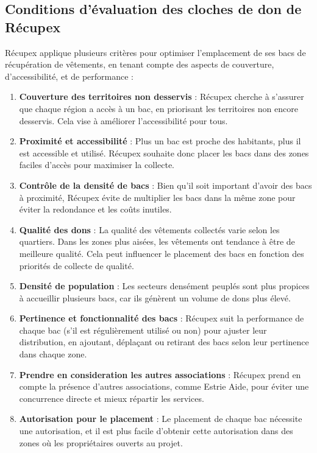 \documentclass[11pt]{article}
\begin{document}
\subsection{Conditions d'évaluation des cloches de don de Récupex}
Récupex applique plusieurs critères pour optimiser l’emplacement de ses bacs de récupération de vêtements, en tenant compte des aspects de couverture, d'accessibilité, et de performance :

\begin{enumerate}
    \item \textbf{Couverture des territoires non desservis} : Récupex cherche à s’assurer que chaque région a accès à un bac, en priorisant les territoires non encore desservis. Cela vise à améliorer l’accessibilité pour tous.

    \item \textbf{Proximité et accessibilité} : Plus un bac est proche des habitants, plus il est accessible et utilisé. Récupex souhaite donc placer les bacs dans des zones faciles d’accès pour maximiser la collecte.

    \item \textbf{Contrôle de la densité de bacs} : Bien qu’il soit important d’avoir des bacs à proximité, Récupex évite de multiplier les bacs dans la même zone pour éviter la redondance et les coûts inutiles.

    \item\textbf{Qualité des dons} : La qualité des vêtements collectés varie selon les quartiers. Dans les zones plus aisées, les vêtements ont tendance à être de meilleure qualité. Cela peut influencer le placement des bacs en fonction des priorités de collecte de qualité.

    \item\textbf{Densité de population} : Les secteurs densément peuplés sont plus propices à accueillir plusieurs bacs, car ils génèrent un volume de dons plus élevé.

    \item\textbf{Pertinence et fonctionnalité des bacs} : Récupex suit la performance de chaque bac (s’il est régulièrement utilisé ou non) pour ajuster leur distribution, en ajoutant, déplaçant ou retirant des bacs selon leur pertinence dans chaque zone.

    \item\textbf{Prendre en consideration les autres associations} : Récupex prend en compte la présence d’autres associations, comme Estrie Aide, pour éviter une concurrence directe et mieux répartir les services.

    \item\textbf{Autorisation pour le placement} : Le placement de chaque bac nécessite une autorisation, et il est plus facile d’obtenir cette autorisation dans des zones où les propriétaires ouverts au projet.
\end{enumerate}
\end{document}
